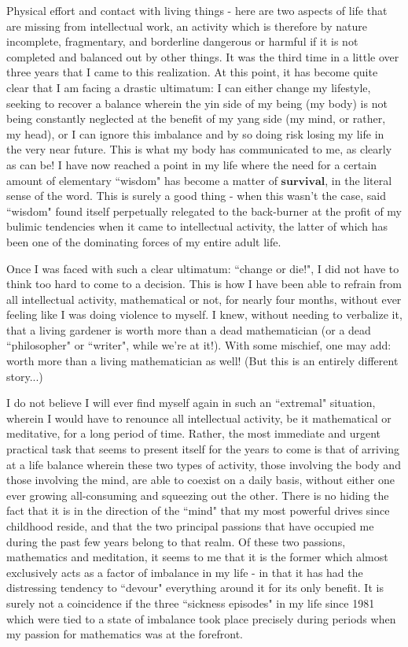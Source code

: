 Physical effort and contact with living things - here are two aspects of life that are missing from intellectual work, an activity which is therefore by nature incomplete, fragmentary, and borderline dangerous or harmful if it is not completed and balanced out by other things. It was the third time in a little over three years that I came to this realization. At this point, it has become quite clear that I am facing a drastic ultimatum: I can either change my lifestyle, seeking to recover a balance wherein the yin side of my being (my body) is not being constantly neglected at the benefit of my yang side (my mind, or rather, my head), or I can ignore this imbalance and by so doing risk losing my life in the very near future. This is what my body has communicated to me, as clearly as can be! I have now reached a point in my life where the need for a certain amount of elementary ``wisdom" has become a matter of $\textbf{survival}$, in the literal sense of the word. This is surely a good thing - when this wasn't the case, said ``wisdom" found itself perpetually relegated to the back-burner at the profit of my bulimic tendencies when it came to intellectual activity, the latter of which has been one of the dominating forces of my entire adult life.

Once I was faced with such a clear ultimatum: ``change or die!", I did not have to think too hard to come to a decision. This is how I have been able to refrain from all intellectual activity, mathematical or not, for nearly four months, without ever feeling like I was doing violence to myself. I knew, without needing to verbalize it, that a living gardener is worth more than a dead mathematician (or a dead ``philosopher" or ``writer", while we're at it!). With some mischief, one may add: worth more than a living mathematician as well! (But this is an entirely different story...)

I do not believe I will ever find myself again in such an ``extremal" situation, wherein I would have to renounce all intellectual activity, be it mathematical or meditative, for a long period of time. Rather, the most immediate and urgent practical task that seems to present itself for the years to come is that of arriving at a life balance wherein these two types of activity, those involving the body and those involving the mind, are able to coexist on a daily basis, without either one ever growing all-consuming and squeezing out the other. There is no hiding the fact that it is in the direction of the ``mind" that my most powerful drives since childhood reside, and that the two principal passions that have occupied me during the past few years belong to that realm. Of these two passions, mathematics and meditation, it seems to me that it is the former which almost exclusively acts as a factor of imbalance in my life - in that it has had the distressing tendency to ``devour" everything around it for its only benefit. It is surely not a coincidence if the three ``sickness episodes" in my life since 1981 which were tied to a state of imbalance took place precisely during periods when my passion for mathematics was at the forefront. 

